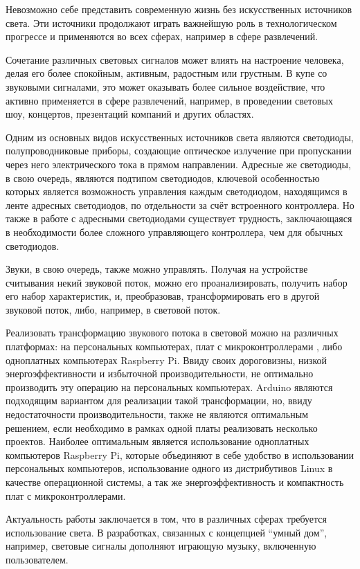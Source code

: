 \intro

Невозможно себе представить современную жизнь без искусственных источников света. Эти источники продолжают играть важнейшую роль в технологическом прогрессе и применяются во всех сферах, например в сфере развлечений.

Сочетание различных световых сигналов может влиять на настроение человека, делая его более спокойным, активным, радостным или грустным. В купе со звуковыми сигналами, это может оказывать более сильное воздействие, что активно применяется в сфере развлечений, например, в проведении световых шоу, концертов, презентаций компаний и других областях.

Одним из основных видов искусственных источников света являются светодиоды, полупроводниковые приборы, создающие оптическое излучение при пропускании через него электрического тока в прямом направлении. Адресные же светодиоды, в свою очередь, являются подтипом светодиодов, ключевой особенностью которых является возможность управления каждым светодиодом, находящимся в ленте адресных светодиодов, по отдельности за счёт встроенного контроллера. Но также в работе с адресными светодиодами существует трудность, заключающаяся в необходимости более сложного управляющего контроллера, чем для обычных светодиодов.

Звуки, в свою очередь, также можно управлять. Получая на устройстве считывания некий звуковой поток, можно его проанализировать, получить набор его набор характеристик, и, преобразовав, трансформировать его в другой звуковой поток, либо, например, в световой поток.

Реализовать трансформацию звукового потока в световой можно на различных платформах: на персональных компьютерах, плат с микроконтроллерами , либо одноплатных компьютерах Raspberry Pi. Ввиду своих дороговизны, низкой энергоэффективности и избыточной производительности, не оптимально производить эту операцию на персональных компьютерах. Arduino являются подходящим вариантом для реализации такой трансформации, но, ввиду недостаточности производительности, также не являются оптимальным решением, если необходимо в рамках одной платы реализовать несколько проектов. Наиболее оптимальным является использование одноплатных компьютеров Raspberry Pi, которые объединяют в себе удобство в использовании персональных компьютеров, использование одного из дистрибутивов Linux в качестве операционной системы, а так же энергоэффективность и компактность плат с микроконтроллерами.

Актуальность работы заключается в том, что в различных сферах требуется использование света. В разработках, связанных с концепцией ``умный дом'', например, световые сигналы дополняют играющую музыку, включенную пользователем.

